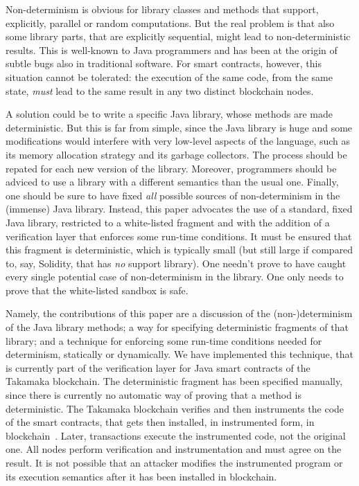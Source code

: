Non-determinism is obvious for library classes and methods that support, explicitly,
parallel or random computations. But the real problem is that
also some library parts, that are explicitly sequential, might lead to
non-deterministic results.
This is well-known to Java programmers and has been at the origin of subtle
bugs also in traditional software. For smart contracts, however,
this situation cannot be tolerated: the execution of the same code, from the same state,
\emph{must} lead to the same result in any two distinct blockchain nodes.

A solution could be to write a specific Java library, whose
methods are made deterministic. But this is far from simple, since the Java library is huge
and some modifications would interfere with very low-level aspects of the language, such as
its memory allocation strategy and its garbage collectors.
The process should be repated for each new version of the library.
Moreover, programmers should be adviced to use a library with a different semantics than the usual one.
Finally, one should be sure to have fixed \emph{all} possible sources of non-determinism in the
(immense) Java library.
Instead, this paper advocates the use of a standard, fixed Java library, restricted to a white-listed
fragment and with the addition of a verification layer that enforces some run-time conditions.
It must be ensured that this fragment is deterministic, which is typically small (but still
large if compared to, say, Solidity, that has \emph{no} support library). One needn't prove
to have caught every single potential case of non-determinism in the library. One only needs to
prove that the white-listed sandbox is safe.

Namely, the contributions of this paper are a discussion of the (non-)determinism
of the Java library methods; a way for specifying deterministic fragments
of that library; and a technique for
enforcing some run-time conditions needed for determinism, statically or dynamically.
We have implemented this technique, that is currently part of the verification
layer for Java smart contracts of the Takamaka blockchain.
The deterministic fragment has been specified manually, since there is
currently no automatic way of proving that a method is deterministic.
The Takamaka blockchain verifies and then instruments the code of the smart contracts, that gets
then installed, in instrumented form, in blockchain~\cite{Spoto19}. Later, transactions execute the
instrumented code, not the original one. All nodes perform verification and instrumentation
and must agree on the result. It is not possible that an attacker modifies the instrumented program
or its execution semantics after it has been installed in blockchain.

